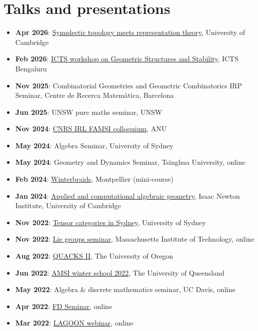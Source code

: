 \documentclass[a4paper]{moderncv}
\begin{document}
\section*{Talks and presentations}
\label{sec:org7a4c296}
\begin{itemize}
\item \textbf{Apr 2026}: \href{https://sites.google.com/cam.ac.uk/st-meets-rt-april-2026/home}{Symplectic topology meets representation theory}, University of Cambridge
\item \textbf{Feb 2026}: \href{https://www.icts.res.in/program/stability}{ICTS workshop on Geometric Structures and Stability}, ICTS Bengaluru
\item \textbf{Nov 2025}: Combinatorial Geometries and Geometric Combinatorics IRP Seminar, Centre de Recerca Matemàtica, Barcelona
\item \textbf{Jun 2025}: UNSW pure maths seminar, UNSW
\item \textbf{Nov 2024}: \href{https://maths.anu.edu.au/news-events/events/cnrs-irl-famsi-research-talks}{CNRS IRL FAMSI colloquium}, ANU
\item \textbf{May 2024}: Algebra Seminar, University of Sydney
\item \textbf{May 2024}: Geometry and Dynamics Seminar, Tsinghua University, online
\item \textbf{Feb 2024}: \href{https://winterbraids-xiii.sciencesconf.org/}{Winterbraids}, Montpellier (mini-course)
\item \textbf{Jan 2024}: \href{https://www.newton.ac.uk/event/emgw02/}{Applied and computational algebraic geometry}, Isaac Newton Institute, University of Cambridge
\item \textbf{Nov 2022}: \href{https://www.maths.usyd.edu.au/u/kevinc/TensorCat.html}{Tensor categories in Sydney}, University of Sydney
\item \textbf{Nov 2022}: \href{https://math.mit.edu/lg/}{Lie groups seminar}, Massachusetts Institute of Technology, online
\item \textbf{Aug 2022}: \href{https://pages.uoregon.edu/belias/QUACKSII/index.html}{QUACKS II}, The University of Oregon
\item \textbf{Jun 2022}: \href{https://ws.amsi.org.au/}{AMSI winter school 2022}, The University of Queensland
\item \textbf{May 2022}: Algebra \& discrete mathematics seminar, UC Davis, online
\item \textbf{Apr 2022}: \href{https://www.fd-seminar.xyz/}{FD Seminar}, online
\item \textbf{Mar 2022}: \href{https://sites.google.com/view/lagoonwebinar/home}{LAGOON webinar}, online

\end{itemize}
\end{document}
